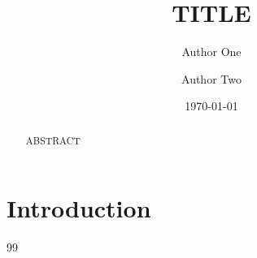 \documentclass[11pt]{article}
\title{\bfseries TITLE}
\author[1]{Author One}\author[2]{Author Two}
\affil[1]{Affiliation 1}\affil[2]{Affiliation 2}
\date{\today}
\begin{document}
\maketitle
\begin{abstract}\noindent ABSTRACT\end{abstract}
\section{Introduction}

\begin{thebibliography}{99}
\end{thebibliography}
\end{document}
